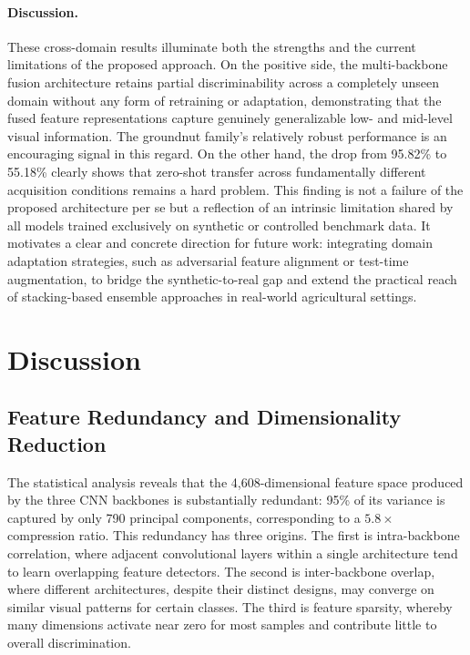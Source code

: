 \documentclass[pdflatex,sn-basic]{sn-jnl}
\begin{document}
\paragraph{Discussion.}
These cross-domain results illuminate both the strengths and the current limitations of the proposed approach. On the positive side, the multi-backbone fusion architecture retains partial discriminability across a completely unseen domain without any form of retraining or adaptation, demonstrating that the fused feature representations capture genuinely generalizable low- and mid-level visual information. The groundnut family's relatively robust performance is an encouraging signal in this regard. On the other hand, the drop from 95.82\% to 55.18\% clearly shows that zero-shot transfer across fundamentally different acquisition conditions remains a hard problem. This finding is not a failure of the proposed architecture per se but a reflection of an intrinsic limitation shared by all models trained exclusively on synthetic or controlled benchmark data. It motivates a clear and concrete direction for future work: integrating domain adaptation strategies, such as adversarial feature alignment or test-time augmentation, to bridge the synthetic-to-real gap and extend the practical reach of stacking-based ensemble approaches in real-world agricultural settings.

\section{Discussion}
\label{sec:discussion}

\subsection{Feature Redundancy and Dimensionality Reduction}

The statistical analysis reveals that the 4,608-dimensional feature space produced by the three CNN backbones is substantially redundant: 95\% of its variance is captured by only 790 principal components, corresponding to a $5.8\times$ compression ratio. This redundancy has three origins. The first is intra-backbone correlation, where adjacent convolutional layers within a single architecture tend to learn overlapping feature detectors. The second is inter-backbone overlap, where different architectures, despite their distinct designs, may converge on similar visual patterns for certain classes. The third is feature sparsity, whereby many dimensions activate near zero for most samples and contribute little to overall discrimination.
\end{document}
